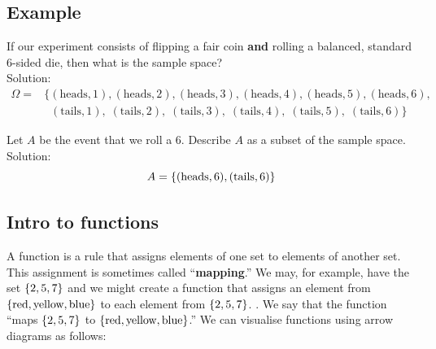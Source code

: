 \subsection{Example} \label{outcome space}
If our experiment consists of flipping a fair coin \textbf{and} rolling a balanced, standard 6-sided die, then what is the sample space? \\

Solution:
\begin{align*}
\Omega = & \{(\text{heads},1),(\text{heads},2),(\text{heads},3),(\text{heads},4),(\text{heads},5),(\text{heads},6), \\
		& \;\;(\text{tails},1),\;(\text{tails},2),\;(\text{tails},3),\;(\text{tails},4),\;(\text{tails},5),\;(\text{tails},6)\}
\end{align*}

\noindent Let $A$ be the event that we roll a 6. Describe $A$ as a subset of the sample space. \\

Solution:
\[
A = \left\{(\text{heads},6),(\text{tails},6)\right\}
\]


\subsection{Intro to functions} \label{sectionfunctions}
A function \label{function} is a rule that assigns elements of one set to elements of another set. This assignment is sometimes called ``\textbf{mapping}.'' We may, for example, have the set $\left\{2,5,7\right\}$ and we might create a function that assigns an element from $\left\{\text{red},\text{yellow},\text{blue}\right\}$ to each element from $\left\{2,5,7\right\}$. \label{mapping}. We say that the function ``maps $\left\{2,5,7\right\}$ to $\left\{\text{red},\text{yellow},\text{blue}\right\}$.'' We can visualise functions using arrow diagrams as follows:
\begin{center}
\end{center}

